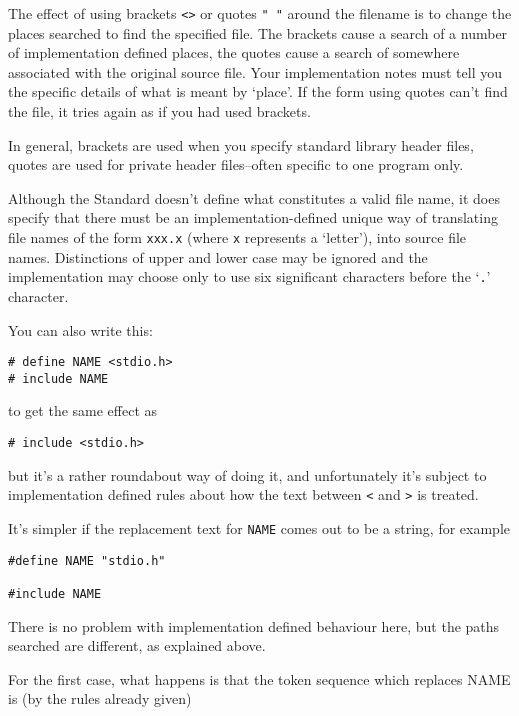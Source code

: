    The effect of using brackets \texttt{<>} or quotes
    \texttt{" "} around the filename is to change the places
    searched to find the specified file. The brackets cause a search of
    a number of implementation defined places, the quotes cause a search of
    somewhere associated with the original source file. Your implementation
    notes must tell you the specific details of what is meant by
    `place'. If the form using quotes can't find the file, it tries
    again as if you had used brackets.


   In general, brackets are used when you specify standard library header
    files, quotes are used for private header files--often specific to
    one program only.


   Although the Standard doesn't define what constitutes a valid file
    name, it does specify that there must be an implementation-defined
    unique way of translating file names of the form \texttt{xxx.x}
    (where \texttt{x} represents a `letter'), into source file
    names.  Distinctions of upper and lower case may be ignored and the
    implementation may choose only to use six significant characters before
    the `\texttt{.}' character.


   You can also write this:


   \begin{Verbatim}
# define NAME <stdio.h>
# include NAME
\end{Verbatim}

   to get the same effect as


   \begin{Verbatim}
# include <stdio.h>
\end{Verbatim}

   but it's a rather roundabout way of doing it, and unfortunately it's
    subject to implementation defined rules about how the text
    between \texttt{<} and \texttt{>} is
    treated.


   It's simpler if the replacement text for \texttt{NAME} comes out
    to be a string, for example


   \begin{Verbatim}
#define NAME "stdio.h"

#include NAME
\end{Verbatim}

   There is no problem with implementation defined behaviour here, but
    the paths searched are different, as explained above.


   For the first case, what happens is that the token sequence which
    replaces NAME is (by the rules already given)


